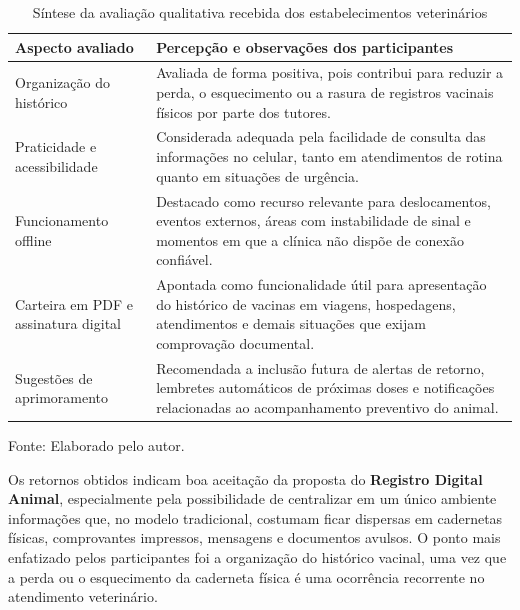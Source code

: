 \documentclass{UNESC}
\begin{document}
\begin{table}[htbp]
\centering
\caption{Síntese da avaliação qualitativa recebida dos estabelecimentos veterinários}
\label{tab:resumo_qualitativo}
\par\vspace{4pt}
\small
\setlength{\tabcolsep}{5pt}
\renewcommand{\arraystretch}{1.15}
\begin{tabular}{@{}p{} p{}@{}}
\hline
\textbf{Aspecto avaliado} & \textbf{Percepção e observações dos participantes} \\
\hline
Organização do histórico & Avaliada de forma positiva, pois contribui para reduzir a perda, o esquecimento ou a rasura de registros vacinais físicos por parte dos tutores. \\
Praticidade e acessibilidade & Considerada adequada pela facilidade de consulta das informações no celular, tanto em atendimentos de rotina quanto em situações de urgência. \\
Funcionamento offline & Destacado como recurso relevante para deslocamentos, eventos externos, áreas com instabilidade de sinal e momentos em que a clínica não dispõe de conexão confiável. \\
Carteira em PDF e assinatura digital & Apontada como funcionalidade útil para apresentação do histórico de vacinas em viagens, hospedagens, atendimentos e demais situações que exijam comprovação documental. \\
Sugestões de aprimoramento & Recomendada a inclusão futura de alertas de retorno, lembretes automáticos de próximas doses e notificações relacionadas ao acompanhamento preventivo do animal. \\
\hline
\end{tabular}
\par\vspace{2pt}
\begin{minipage}{\linewidth}
\footnotesize\raggedright
Fonte: Elaborado pelo autor.
\end{minipage}
\end{table}

Os retornos obtidos indicam boa aceitação da proposta do \textbf{Registro Digital Animal}, especialmente pela possibilidade de centralizar em um único ambiente informações que, no modelo tradicional, costumam ficar dispersas em cadernetas físicas, comprovantes impressos, mensagens e documentos avulsos. O ponto mais enfatizado pelos participantes foi a organização do histórico vacinal, uma vez que a perda ou o esquecimento da caderneta física é uma ocorrência recorrente no atendimento veterinário.
\end{document}
